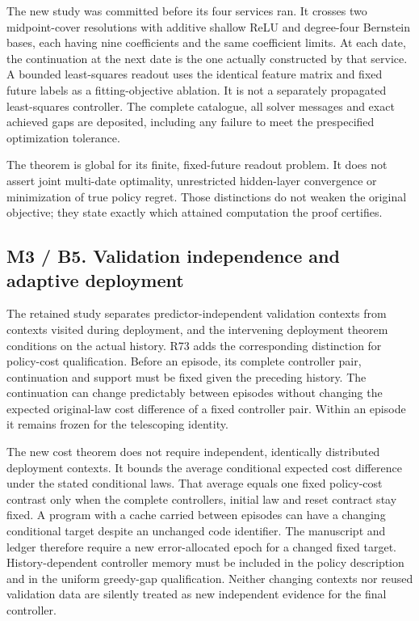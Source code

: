 The new study was committed before its four services ran. It crosses two
midpoint-cover resolutions with additive shallow ReLU and degree-four
Bernstein bases, each having nine coefficients and the same coefficient
limits. At each date, the continuation at the next date is the one
actually constructed by that service. A bounded least-squares readout
uses the identical feature matrix and fixed future labels as a
fitting-objective ablation. It is not a separately propagated
least-squares controller. The complete catalogue, all solver messages
and exact achieved gaps are deposited, including any failure to meet the
prespecified optimization tolerance.

The theorem is global for its finite, fixed-future readout problem. It
does not assert joint multi-date optimality, unrestricted hidden-layer
convergence or minimization of true policy regret. Those distinctions do
not weaken the original objective; they state exactly which attained
computation the proof certifies.

\hypertarget{m3-b5.-validation-independence-and-adaptive-deployment}{%
\subsection{M3 / B5. Validation independence and adaptive
deployment}\label{m3-b5.-validation-independence-and-adaptive-deployment}}

The retained study separates predictor-independent validation contexts
from contexts visited during deployment, and the intervening deployment
theorem conditions on the actual history. R73 adds the corresponding
distinction for policy-cost qualification. Before an episode, its
complete controller pair, continuation and support must be fixed given
the preceding history. The continuation can change predictably between
episodes without changing the expected original-law cost difference of a
fixed controller pair. Within an episode it remains frozen for the
telescoping identity.

The new cost theorem does not require independent, identically
distributed deployment contexts. It bounds the average conditional
expected cost difference under the stated conditional laws. That average
equals one fixed policy-cost contrast only when the complete
controllers, initial law and reset contract stay fixed. A program with a
cache carried between episodes can have a changing conditional target
despite an unchanged code identifier. The manuscript and ledger
therefore require a new error-allocated epoch for a changed fixed
target. History-dependent controller memory must be included in the
policy description and in the uniform greedy-gap qualification. Neither
changing contexts nor reused validation data are silently treated as new
independent evidence for the final controller.

